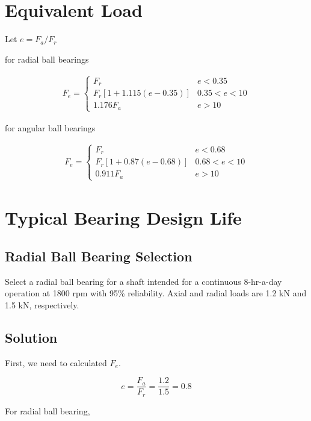 \documentclass[a4paper,openany]{tufte-book}
\begin{document}
\section{Equivalent Load}
\label{sec:org2f921be}
Let \(e = F_a / F_r\)

for radial ball bearings

\begin{align}
    F_e = \left\{
    \begin{array}{ll}
        F_r & e < 0.35 \\
        F_r \left[ 1 + 1.115(e - 0.35) \right] & 0.35 < e < 10 \\
        1.176 F_a & e > 10
    \end{array}
    \right.
\end{align}

for angular ball bearings

\begin{align}
    F_e = \left\{
    \begin{array}{ll}
        F_r & e < 0.68 \\
        F_r \left[ 1 + 0.87(e - 0.68) \right] & 0.68 < e < 10 \\
        0.911 F_a & e > 10
    \end{array}
    \right.
\end{align}

\section{Typical Bearing Design Life}
\label{sec:orgd892fe3}


\subsection{Radial Ball Bearing Selection}
\label{sec:orge4f0b91}

Select a radial ball bearing for a shaft intended for a continuous 8-hr-a-day operation at 1800 rpm with 95\% reliability. Axial and radial loads are 1.2 kN and 1.5 kN, respectively.

\subsection{Solution}
\label{sec:org36e278c}

First, we need to calculated \(F_e\).

\[e = \frac{F_a}{F_r} = \frac{1.2}{1.5} = 0.8\]

For radial ball bearing,
\end{document}
